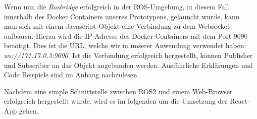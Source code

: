 \begin{flushleft}
\begin{lstlisting}[language=html]
\end{lstlisting}

Wenn nun die \textit{Rosbridge} erfolgreich in der ROS-Umgebung, in diesem Fall innerhalb des Docker Containers unseres Prototypens, gelauncht wurde, kann man sich mit einem Javascript-Objekt eine Verbindung zu dem Websocket aufbauen. Hierzu wird die IP-Adresse des Docker-Containers mit dem Port 9090 benötigt. Dies ist die URL, welche wir in unserer Anwendung verwendet haben: \textit{ws://171.17.0.3:9090}. Ist die Verbindung erfolgreich hergestellt, können Publisher und Subscriber an das Objekt angebunden werden. Ausführliche Erklärungen und Code Beispiele sind im Anhang nachzulesen. 

Nachdem eine simple Schnittstelle zwischen ROS2 und einem Web-Browser erfolgreich hergestellt wurde, wird es im folgenden um die Umsetzung der React-App gehen. 




\end{flushleft}